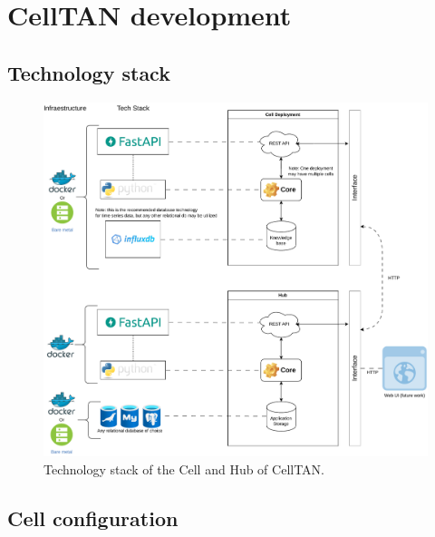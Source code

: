 \chapter{CellTAN development}
\section{Technology stack} \label{ap1:techstack}

\begin{figure}[h!]
    \centering
    \includegraphics[width=\linewidth]{figures/appendix/techstack.pdf}
    \caption{Technology stack of the Cell and Hub of CellTAN.}
    \label{fig:techstack}
\end{figure}


\section{Cell configuration} \label{ap1:config}
 
